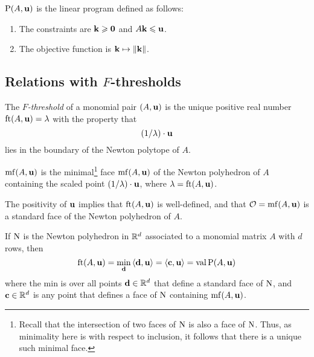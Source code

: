 \documentclass[11pt]{amsart}
\begin{document}
\begin{definition}
$\mathrm{P}(A, \mathbf{u})$ is the linear program defined as follows:
\begin{enumerate}
\item The constraints are $\mathbf{k} \geqslant \mathbf{0}$ and $A \mathbf{k} \leqslant \mathbf{u}$.
\item The objective function is $\mathbf{k} \mapsto \| \mathbf{k} \|$.
\end{enumerate}
\end{definition}




\subsection{Relations with $F$-thresholds}
\label{opt sets: SS}

\begin{definition}
The \emph{$F$-threshold} of a monomial pair $(A, \mathbf{u})$ is the unique positive real number $\operatorname{ft}(A, \mathbf{u}) = \lambda$ with the property that  \[ (1/\lambda)  \cdot \mathbf{u}  \] 
lies in the boundary of the Newton polytope of $A$.  
\end{definition}

\begin{definition}
$\operatorname{mf}(A, \mathbf{u})$ is the minimal\footnote{Recall that the intersection of two faces of $\mathrm{N}$ is also a face of $\mathrm{N}$. Thus, as minimality here is with respect to inclusion, it follows that there is a unique such minimal face.} face $\operatorname{mf}(A, \mathbf{u})$ of the Newton polyhedron of $A$ containing the scaled point $(1/\lambda) \cdot \mathbf{u}$, where $\lambda = \operatorname{ft}(A, \mathbf{u})$.
\end{definition}


\begin{remark}  The positivity of $\mathbf{u}$ implies that $\operatorname{ft}(A, \mathbf{u})$ is well-defined, and that $\mathcal{O} = \operatorname{mf}(A, \mathbf{u})$ is a standard face of the Newton polyhedron of $A$.
\end{remark}

\begin{proposition}
\label{FT descriptions: P}
  If $\mathrm{N}$ is the Newton polyhedron in $\mathbb{R}^d$ associated to a monomial matrix $A$ with $d$ rows, then
\[ \operatorname{ft}(A, \mathbf{u}) = \min_{\mathbf{d}} \, \langle \mathbf{d}, \mathbf{u} \rangle = \langle \mathbf{c}, \mathbf{u} \rangle = \operatorname{val} \mathrm{P}(A, \mathbf{u}) \] where the min is over all points $\mathbf{d} \in \mathbb{R}^d$ that define a standard face of $\mathrm{N}$, and $\mathbf{c} \in \mathbb{R}^d$ is any point that defines a face of $\mathrm{N}$ containing $\operatorname{mf}(A, \mathbf{u})$. 
\end{proposition}
\end{document}
